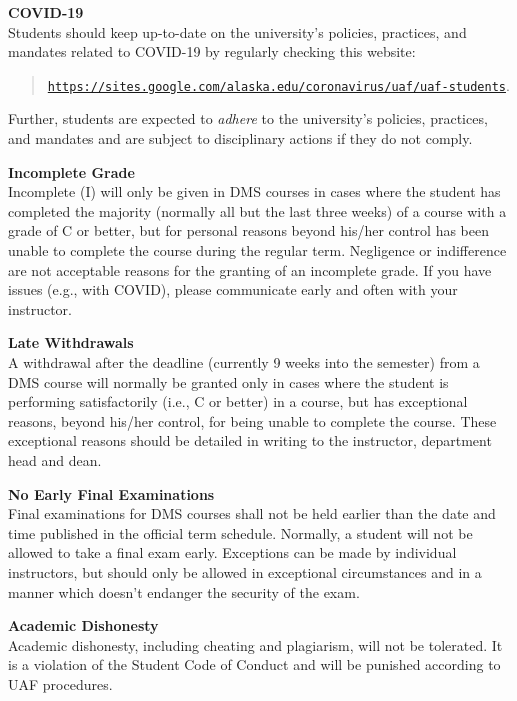 \documentclass[12pt]{article}
\renewcommand{\emph}[1]{\textsf{\textbf{#1}}}
\newcommand{\localhead}[1]{\par\smallskip\textbf{#1}\nobreak\\}%
\def\subheading#1{\localhead{\emph{#1}}}
\begin{document}
\subheading{COVID-19}
Students should keep up-to-date on the university's policies, practices, and mandates related to COVID-19 by regularly checking this website: 
\begin{quote}
\href{https://sites.google.com/alaska.edu/coronavirus/uaf/uaf-students}{\texttt{https://sites.google.com/alaska.edu/coronavirus/uaf/uaf-students}}.
\end{quote} Further, students are expected to {\it adhere} to the university's policies, practices, and mandates and are subject to disciplinary actions if they do not comply.

\subheading{Incomplete Grade} 
Incomplete (I) will only be given in DMS courses in cases where the student has completed the majority (normally all but the last three weeks) of a course with a grade of C or better, but for personal reasons beyond his/her control has been unable to complete the course during the regular term. Negligence or indifference are not acceptable reasons for the granting of an incomplete grade. If you have issues (e.g., with COVID), please communicate early and often with your instructor.

\subheading{Late Withdrawals} 
A withdrawal after the deadline (currently 9 weeks into the semester) from a DMS course will normally be granted only in cases where the student is performing satisfactorily (i.e., C or better) in a course, but has exceptional reasons, beyond his/her control, for being unable to complete the course. These exceptional reasons should be detailed in writing to the instructor, department head and dean.

\subheading{No Early Final Examinations}
Final examinations for DMS courses shall not be held earlier than the date and time published in the official term schedule. Normally, a student will not be allowed to take a final exam early. Exceptions can be made by individual instructors, but should only be allowed in exceptional circumstances and in a manner which doesn't endanger the security of the exam.

\subheading{Academic Dishonesty}
Academic dishonesty, including cheating and plagiarism, will not be tolerated.  It is a violation of the Student Code of Conduct and will be punished according to UAF procedures.
\end{document}
